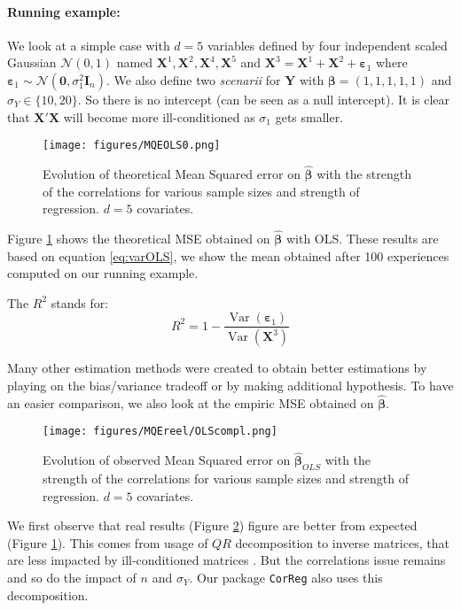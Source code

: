 \documentclass[12pt,a4paper]{report}
\begin{document}
		

	
\paragraph{Running example:} We look at a simple case with $d=5$ variables defined by four independent scaled Gaussian $\mathcal{N}(0,1)$ named $\boldsymbol{X}^1,\boldsymbol{X}^2,\boldsymbol{X}^4,\boldsymbol{X}^5$ and $\boldsymbol{X}^3=\boldsymbol{X}^1+\boldsymbol{X}^2+\boldsymbol{\varepsilon}_1$ where $\boldsymbol{\varepsilon}_1\sim{\mathcal{N}(\boldsymbol{0},\sigma_1^2\boldsymbol{I}_n)}$. We also define two {\it scenarii} for $\boldsymbol{Y}$ with $\boldsymbol{\beta}=(1,1,1,1,1)$ and $\sigma_Y \in \{10,20\}$. So there is no intercept (can be seen as a null intercept).
It is clear that $\boldsymbol{X}'\boldsymbol{X}$ will become more ill-conditioned as $\sigma_1$ gets smaller.
	\\
	
	 \begin{figure}
	 \centering
	  \texttt{[image: figures/MQEOLS0.png]}
	  \caption{Evolution of theoretical Mean Squared error on $\hat{\boldsymbol{\beta}}$ with the strength of the correlations for various sample sizes and strength of regression. $d=5$ covariates. } \label{MQEOLS1}
	\end{figure}
	Figure \ref{MQEOLS1} shows the theoretical MSE obtained on $\hat{\boldsymbol{\beta}}$ with OLS. These results are based on equation \ref{eq:varOLS}, we show the mean obtained after 100 experiences computed on our running example.
	
	The $R^2$ stands for:
	\begin{equation}\label{defR2}
	R^2=1-\frac{\operatorname{Var}(\boldsymbol{\varepsilon}_1)}{\operatorname{Var}(\boldsymbol{X}^3)}
	\end{equation}
	
	
	Many other estimation methods were created to obtain better estimations by playing on the bias/variance tradeoff or by making additional hypothesis.
	To have an easier comparison, we also look at the empiric MSE obtained on $\hat{\boldsymbol{\beta}}$.
		\\
	
	 \begin{figure}
	 \centering
	  \texttt{[image: figures/MQEreel/OLScompl.png]}
	  \caption{Evolution of observed Mean Squared error on $\hat{\boldsymbol{\beta}}_{OLS}$ with the strength of the correlations for various sample sizes and strength of regression. $d=5$ covariates. } \label{MQEOLScompl}
	\end{figure}	
	We first observe that real results (Figure \ref{MQEOLScompl}) figure are better from expected (Figure \ref{MQEOLS1}). This comes from usage of $QR$ decomposition to inverse matrices, that are less impacted by ill-conditioned matrices \cite{bulirsch2002introduction}. But the correlations issue remains and so do the impact of $n$ and $\sigma_Y$.  Our package {\tt CorReg} also uses this decomposition.
	\\
		 \FloatBarrier
		
\end{document}
